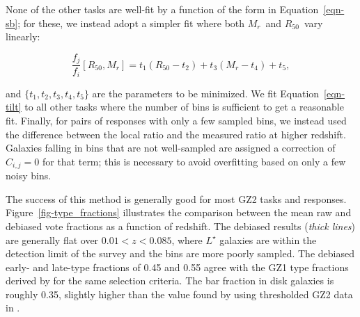 \documentclass[useAMS,usenatbib]{mn2e}
\newcommand{\mr}{$M_r$}
\newcommand{\rfifty}{$R_{50}$}
\begin{document}
None of the other tasks are well-fit by a function of the form in Equation~\ref{eqn-sb}; for these, we instead adopt a simpler fit where both \mr~and \rfifty~vary linearly:

\begin{equation}
\frac{f_j}{f_i}[R_{50},M_r] = t_1(R_{50} - t_2) + t_3(M_r - t_4) + t_5,
\label{eqn-tilt}
\end{equation}

\noindent and $\{t_1,t_2,t_3,t_4,t_5\}$ are the parameters to be minimized. We fit Equation~\ref{eqn-tilt} to all other tasks where the number of bins is sufficient to get a reasonable fit. Finally, for pairs of responses with only a few sampled bins, we instead used the difference between the local ratio and the measured ratio at higher redshift. Galaxies falling in bins that are not well-sampled are assigned a correction of $C_{i,j}=0$ for that term; this is necessary to avoid overfitting based on only a few noisy bins. 



The success of this method is generally good for most GZ2 tasks and responses. Figure~\ref{fig-type_fractions} illustrates the comparison between the mean raw and debiased vote fractions as a function of redshift. The debiased results ({\it thick lines}) are generally flat over $0.01<z<0.085$, where $L^\star$ galaxies \citep[$M_r\sim-20.44$;][]{bla03a} are within the detection limit of the survey and the bins are more poorly sampled. The debiased early- and late-type fractions of 0.45 and 0.55 agree with the GZ1 type fractions derived by \citet{bam09} for the same selection criteria. The bar fraction in disk galaxies is roughly 0.35, slightly higher than the value found by using thresholded GZ2 data in \citet{mas11c}.
\end{document}
